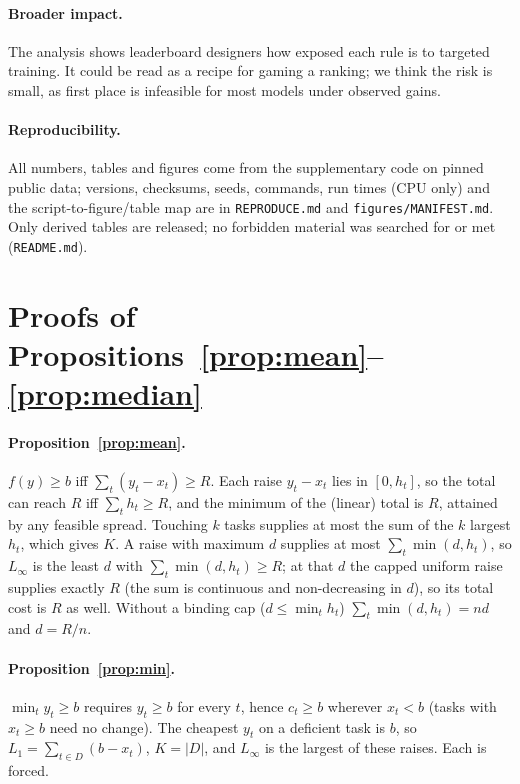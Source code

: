 \documentclass{article}
\begin{document}
\paragraph{Broader impact.}
The analysis shows leaderboard designers how exposed each rule is to targeted training. It could be read as a recipe for gaming a ranking; we think the risk is small, as first place is infeasible for most models under observed gains.

\paragraph{Reproducibility.}\label{sec:repro}
All numbers, tables and figures come from the supplementary code on pinned public data; versions, checksums, seeds, commands, run times (CPU only) and the script-to-figure/table map are in \texttt{REPRODUCE.md} and \texttt{figures/MANIFEST.md}. Only derived tables are released; no forbidden material was searched for or met (\texttt{README.md}).




\appendix
\section{Proofs of Propositions~\ref{prop:mean}--\ref{prop:median}}
\label{app:proofs}
\paragraph{Proposition~\ref{prop:mean}.} $f(y)\ge b$ iff $\sum_t(y_t-x_t)\ge R$. Each raise $y_t-x_t$ lies in $[0,h_t]$, so the total can reach $R$ iff $\sum_th_t\ge R$, and the minimum of the (linear) total is $R$, attained by any feasible spread. Touching $k$ tasks supplies at most the sum of the $k$ largest $h_t$, which gives $K$. A raise with maximum $d$ supplies at most $\sum_t\min(d,h_t)$, so $L_\infty$ is the least $d$ with $\sum_t\min(d,h_t)\ge R$; at that $d$ the capped uniform raise supplies exactly $R$ (the sum is continuous and non-decreasing in $d$), so its total cost is $R$ as well. Without a binding cap ($d\le\min_th_t$) $\sum_t\min(d,h_t)=nd$ and $d=R/n$.
\paragraph{Proposition~\ref{prop:min}.} $\min_ty_t\ge b$ requires $y_t\ge b$ for every $t$, hence $c_t\ge b$ wherever $x_t<b$ (tasks with $x_t\ge b$ need no change). The cheapest $y_t$ on a deficient task is $b$, so $L_1=\sum_{t\in D}(b-x_t)$, $K=|D|$, and $L_\infty$ is the largest of these raises. Each is forced.
\end{document}

